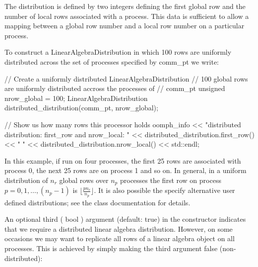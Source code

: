 The distribution is defined by two integers defining the first global row and the number of local rows associated with a process. This data is sufficient to allow a mapping between a global row number and a local row number on a particular process.

To construct a {\ttfamily Linear\+Algebra\+Distribution} in which 100 rows are uniformly distributed across the set of processes specified by {\ttfamily comm\+\_\+pt} we write\+:


\begin{DoxyCodeInclude}



  
  \textcolor{comment}{// Create a uniformly distributed LinearAlgebraDistribution}
  \textcolor{comment}{// 100 global rows are uniformly distributed accross the processes of }
  \textcolor{comment}{// comm\_pt}
  \textcolor{keywordtype}{unsigned} nrow\_global = 100;
  LinearAlgebraDistribution distributed\_distribution(comm\_pt,
                                                     nrow\_global); 

  \textcolor{comment}{// Show us how many rows this processor holds}
  oomph\_info << \textcolor{stringliteral}{"distributed distribution: first\_row and nrow\_local: "}
             << distributed\_distribution.first\_row() << \textcolor{stringliteral}{" "} 
             << distributed\_distribution.nrow\_local() 
             << std::endl;

\end{DoxyCodeInclude}


In this example, if run on four processes, the first 25 rows are associated with process 0, the next 25 rows are on process 1 and so on. In general, in a uniform distribution of $n_r$ global rows over $n_p$ processes the first row on process $p=0,1,\ldots,(n_p-1)$ is $\lfloor \frac{pn_r}{n_p}\rfloor$. It is also possible the specify alternative user defined distributions; see the class documentation for details.

An optional third ( {\ttfamily bool} ) argument (default\+: true) in the constructor indicates that we require a distributed linear algebra distribution. However, on some occasions we may want to replicate all rows of a linear algebra object on all processes. This is achieved by simply making the third argument {\ttfamily false} (non-\/distributed)\+:


